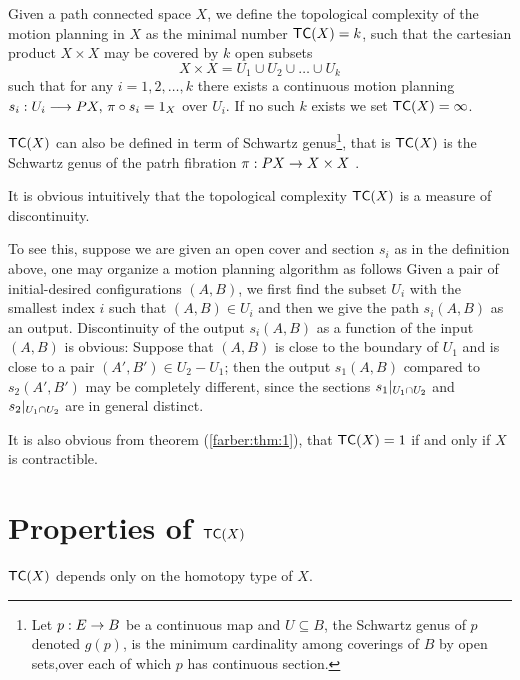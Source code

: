 \begin{defn}
    Given a path connected space $X$, we define the topological complexity of the motion planning in $X$ as the minimal number $\textsf{TC}(X) = k$, such that the cartesian product $X \times X$ may be covered by $k$ open subsets
    \[
        X \times X  = U_1 \cup U_2 \cup \dots \cup U_k
    \]
    such that for any $i = 1,2, \ldots, k$ there exists a continuous motion planning $s_i: U_i \longrightarrow PX, \, \pi \circ s_i = 1_X$ over $U_i$. If no such $k$ exists we set $\textsf{TC}(X) = \infty$.
\end{defn}

\begin{rem}
    $\textsf{TC}(X)$ can also be defined in term of Schwartz genus\footnote{Let $p : E \rightarrow B$ be a continuous map and $U \subseteq B$, the Schwartz genus of $p$ denoted $g(p)$, is the minimum cardinality among coverings of $B$ by open sets,over each of which $p$ has continuous section.}, that is $\textsf{TC}(X)$ is the Schwartz genus of the patrh fibration $\pi : PX \rightarrow X \times X$ \cite{farber2007symmetric}.

    It is obvious intuitively that the topological complexity $\textsf{TC}(X)$ is a measure of discontinuity.

    To see this, suppose we are given an open cover and section $s_i$ as in the definition above, one may organize a motion planning algorithm as follows Given a pair of initial-desired configurations
    $(A, B)$, we first find the subset $U_i$ with the smallest index $i$ such that $(A,B) \in U_i$ and then we give the path $s_i(A,B)$ as an output. Discontinuity of the output $s_i(A,B)$ as a function of the input $(A,B)$ is obvious: Suppose that $(A,B)$ is close to the boundary of $U_1$ and is close to a pair $(A', B') \in U_2 - U_1$; then the output $s_1(A,B)$ compared to $s_2(A',B')$ may be completely different, since the sections $\displaystyle s_1|_{U_1 \cap U_2}$ and $\displaystyle s_2|_{U_1 \cap U_2}$ are in general distinct.

    It is also obvious from theorem (\ref{farber:thm:1}), that $\textsf{TC}(X) = 1$ if and only if $X$ is contractible.
\end{rem}

\section{Properties of $\textsf{TC}(X)$}

\begin{thm}\label{homtopy:invariance}
    $\textsf{TC}(X)$ depends only on the homotopy type of $X$.
\end{thm}

